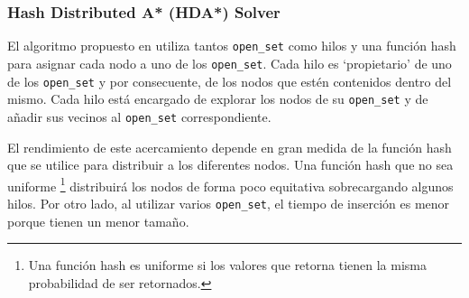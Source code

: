 \pagebreak

\subsubsection{Hash Distributed A* (HDA*) Solver}

El algoritmo propuesto en \cite{KFB09}
utiliza tantos \lstinline{open_set} como hilos
y una función hash para asignar cada nodo a uno de los
\lstinline{open_set}.
Cada hilo es `propietario' de uno de los \lstinline{open_set}
y por consecuente, de los nodos que estén contenidos
dentro del mismo.
Cada hilo está encargado de explorar los nodos de su
\lstinline{open_set} y de añadir sus vecinos
al \lstinline{open_set} correspondiente.

El rendimiento de este acercamiento depende en gran medida de la
función hash que se utilice para distribuir a los diferentes nodos.
Una función hash que no sea uniforme
\footnote{Una función hash es uniforme si los valores que retorna
tienen la misma probabilidad de ser retornados.}
distribuirá los nodos de forma poco equitativa
sobrecargando algunos hilos.
Por otro lado, al utilizar varios \lstinline{open_set},
el tiempo de inserción es menor porque tienen un menor tamaño.

